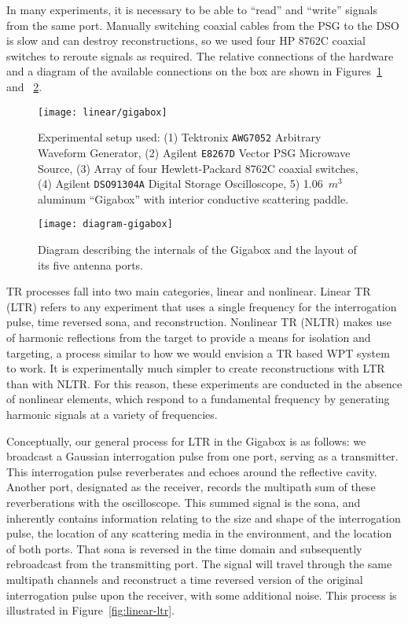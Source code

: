 In many experiments, it is necessary to be able to ``read'' and ``write'' signals from the same port. Manually switching coaxial cables from the PSG to the DSO is slow and can destroy reconstructions, so we used four HP 8762C coaxial switches to reroute signals as required. The relative connections of the hardware and a diagram of the available connections on the box are shown in Figures~\ref{fig:linear-gigabox} and ~\ref{fig:diagram-gigabox}.

\begin{figure}[h!]
\centering
\texttt{[image: linear/gigabox]}
    \caption[Experimental Setup]{Experimental setup used: (1) Tektronix \texttt{AWG7052} Arbitrary Waveform Generator, (2) Agilent \texttt{E8267D} Vector PSG Microwave Source, (3) Array of four Hewlett-Packard 8762C coaxial switches, (4) Agilent \texttt{DSO91304A} Digital Storage Oscilloscope, 5) 1.06~$m^3$ aluminum ``Gigabox'' with interior conductive scattering paddle.}
    \label{fig:linear-gigabox}
\end{figure}

\begin{figure}[h!]
\centering
\texttt{[image: diagram-gigabox]}
    \caption[Experimental Setup: Gigabox Detail]{Diagram describing the internals of the Gigabox and the layout of its five antenna ports.}
    \label{fig:diagram-gigabox}
\end{figure}

TR processes fall into two main categories, linear and nonlinear. Linear TR (LTR) refers to any experiment that uses a single frequency for the interrogation pulse, time reversed sona, and reconstruction. Nonlinear TR (NLTR) makes use of harmonic reflections from the target to provide a means for isolation and targeting, a process similar to how we would envision a TR based WPT system to work.  It is experimentally much simpler to create reconstructions with LTR than with NLTR. For this reason, these experiments are conducted in the absence of nonlinear elements, which respond to a fundamental frequency by generating harmonic signals at a variety of frequencies.

Conceptually, our general process for LTR in the Gigabox is as follows: we broadcast a Gaussian interrogation pulse from one port, serving as a transmitter. This interrogation pulse reverberates and echoes around the reflective cavity. Another port, designated as the receiver, records the multipath sum of these reverberations with the oscilloscope. This summed signal is the sona, and inherently contains information relating to the size and shape of the interrogation pulse, the location of any scattering media in the environment, and the location of both ports. That sona is reversed in the time domain and subsequently rebroadcast from the transmitting port. The signal will travel through the same multipath channels and reconstruct a time reversed version of the original interrogation pulse upon the receiver, with some additional noise. This process is illustrated in Figure~\ref{fig:linear-ltr}. 

